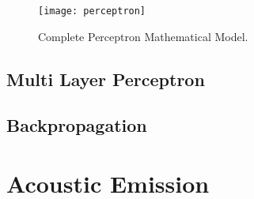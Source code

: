 \begin{figure}[H]
	\centering
	\texttt{[image: perceptron]}
	\caption{Complete Perceptron Mathematical Model.}
	\label{fig:perceptron}
\end{figure}



\subsection{Multi Layer Perceptron}

\subsection{Backpropagation}

\section{Acoustic Emission}

